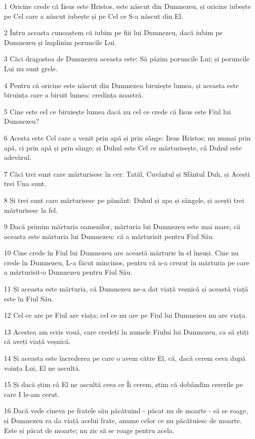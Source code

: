\par 1 Oricine crede că Iisus este Hristos, este născut din Dumnezeu, și oricine iubește pe Cel care a născut iubește și pe Cel ce S-a născut din El.
\par 2 Întru aceasta cunoaștem că iubim pe fiii lui Dumnezeu, dacă iubim pe Dumnezeu și împlinim poruncile Lui.
\par 3 Căci dragostea de Dumnezeu aceasta este: Să păzim poruncile Lui; și poruncile Lui nu sunt grele.
\par 4 Pentru că oricine este născut din Dumnezeu biruiește lumea, și aceasta este biruința care a biruit lumea: credința noastră.
\par 5 Cine este cel ce biruiește lumea dacă nu cel ce crede că Iisus este Fiul lui Dumnezeu?
\par 6 Acesta este Cel care a venit prin apă și prin sânge: Iisus Hristos; nu numai prin apă, ci prin apă și prin sânge; și Duhul este Cel ce mărturisește, că Duhul este adevărul.
\par 7 Căci trei sunt care mărturisesc în cer: Tatăl, Cuvântul și Sfântul Duh, și Acești trei Una sunt.
\par 8 Și trei sunt care mărturisesc pe pământ: Duhul și apa și sângele, și acești trei mărturisesc la fel.
\par 9 Dacă primim mărturia oamenilor, mărturia lui Dumnezeu este mai mare, că aceasta este mărturia lui Dumnezeu: că a mărturisit pentru Fiul Său.
\par 10 Cine crede în Fiul lui Dumnezeu are această mărturie în el însuși. Cine nu crede în Dumnezeu, L-a făcut mincinos, pentru că n-a crezut în mărturia pe care a mărturisit-o Dumnezeu pentru Fiul Său.
\par 11 Și aceasta este mărturia, că Dumnezeu ne-a dat viață veșnică și această viață este în Fiul Său.
\par 12 Cel ce are pe Fiul are viața; cel ce nu are pe Fiul lui Dumnezeu nu are viața.
\par 13 Acestea am scris vouă, care credeți în numele Fiului lui Dumnezeu, ca să știți că aveți viață veșnică.
\par 14 Și aceasta este încrederea pe care o avem către El, că, dacă cerem ceva după voința Lui, El ne ascultă.
\par 15 Și dacă știm că El ne ascultă ceea ce Îi cerem, știm că dobândim cererile pe care I le-am cerut.
\par 16 Dacă vede cineva pe fratele său păcătuind - păcat nu de moarte - să se roage, și Dumnezeu va da viață acelui frate, anume celor ce nu păcătuiesc de moarte. Este și păcat de moarte; nu zic să se roage pentru acela.
